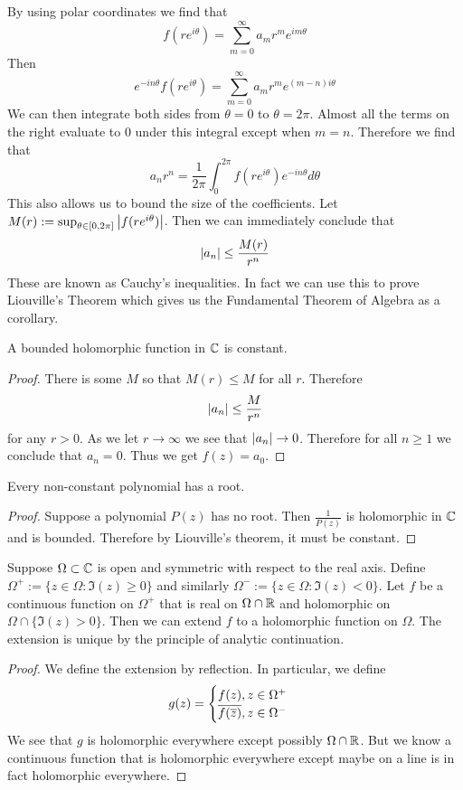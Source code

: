 By using polar coordinates we find that
$$ f(re^{i \theta}) = \sum_{m = 0}^\infty a_m r^m e^{im \theta} $$
Then
$$ e^{-in \theta} f(r e^{i \theta}) = \sum_{m = 0}^\infty a_m r^m e^{(m - n)i\theta} $$
We can then integrate both sides from $\theta = 0$ to $\theta = 2\pi$. Almost all the terms on the right evaluate to 0 under this integral except when $m = n$. Therefore we find that
$$ a_n r^n = \frac{1}{2\pi} \int_{0}^{2\pi} f(re^{i \theta}) e^{-in \theta} d\theta $$
This also allows us to bound the size of the coefficients. Let $M(r) := \sup_{\theta \in [0, 2\pi]} \left|f(re^{i \theta})\right|$. Then we can immediately conclude that
$$ \left|a_n\right| \leq \frac{M(r)}{r^n} $$
These are known as Cauchy's inequalities. In fact we can use this to prove Liouville's Theorem which gives us the Fundamental Theorem of Algebra as a corollary.
\begin{theorem}
A bounded holomorphic function in $\mathbb{C}$ is constant.
\end{theorem}
\begin{proof}
    There is some $M$ so that $M(r) \leq M$ for all $r$. Therefore
    $$ \left|a_n\right| \leq \frac{M}{r^n} $$
    for any $r > 0$. As we let $r \to \infty$ we see that $\left|a_n\right| \to 0$. Therefore for all $n \geq 1$ we conclude that $a_n = 0$. Thus we get $f(z) = a_0$.
\end{proof}
\begin{corollary}
    Every non-constant polynomial has a root.
\end{corollary}
\begin{proof}
    Suppose a polynomial $P(z)$ has no root. Then $\frac{1}{P(z)}$ is holomorphic in $\mathbb{C}$ and is bounded. Therefore by Liouville's theorem, it must be constant.
\end{proof}

\begin{proposition}
Suppose $\Omega \subset \mathbb{C}$ is open and symmetric with respect to the real axis. Define $\Omega^+ := \{z \in \Omega : \Im(z) \geq 0\}$ and similarly $\Omega^- := \{z \in \Omega : \Im(z) < 0\}$. Let $f$ be a continuous function on $\Omega^+$ that is real on $\Omega \cap \mathbb{R}$ and holomorphic on $\Omega \cap \{\Im(z) > 0\}$. Then we can extend $f$ to a holomorphic function on $\Omega$. The extension is unique by the principle of analytic continuation.
\end{proposition}
\begin{proof}
    We define the extension by reflection. In particular, we define
    \begin{align*}
        g(z) = \begin{cases}
            f(z) , z \in \Omega^+\\
            \overline{f(\overline{z})}, z \in \Omega^-
        \end{cases}
    \end{align*}
    We see that $g$ is holomorphic everywhere except possibly $\Omega \cap \mathbb{R}$. But we know a continuous function that is holomorphic everywhere except maybe on a line is in fact holomorphic everywhere.
\end{proof}

